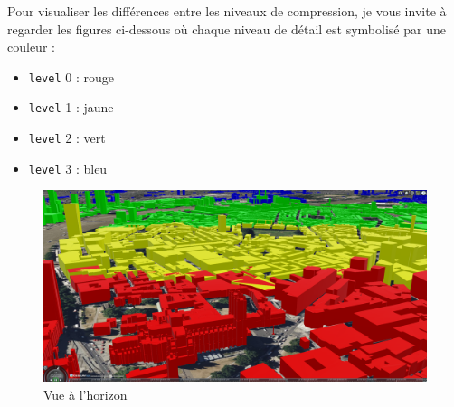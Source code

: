 Pour visualiser les différences entre les niveaux de compression, je vous invite à regarder les figures ci-dessous où chaque niveau de détail est symbolisé par une couleur :

\begin{itemize}
    \item \texttt{level} 0 : rouge
    \item \texttt{level} 1 : jaune
    \item \texttt{level} 2 : vert
    \item \texttt{level} 3 : bleu
\end{itemize}


\begin{figure}[H]
    \centering
    \includegraphics[width=1\textwidth]{assets/figures/lods-horizon.png}
    \caption{Vue à l'horizon}
    \label{fig:lods-horizon}
\end{figure}

